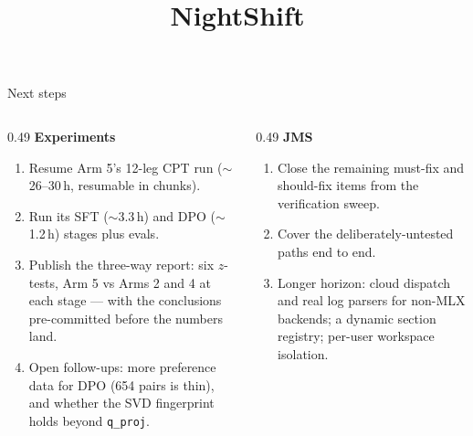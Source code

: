 \documentclass[aspectratio=169,11pt]{beamer}
\begin{document}
\begin{frame}{Next steps}
  \small
  \begin{columns}[T]
    \begin{column}{0.49\textwidth}
      \textbf{Experiments}
      \begin{enumerate}
        \item Resume Arm 5's 12-leg CPT run ($\sim$26--30\,h, resumable in chunks).
        \item Run its SFT ($\sim$3.3\,h) and DPO ($\sim$1.2\,h) stages plus evals.
        \item Publish the three-way report: six $z$-tests, Arm 5 vs Arms 2 and 4 at each stage --- with the conclusions pre-committed before the numbers land.
        \item Open follow-ups: more preference data for DPO (654 pairs is thin), and whether the SVD fingerprint holds beyond \texttt{q\_proj}.
      \end{enumerate}
    \end{column}
    \begin{column}{0.49\textwidth}
      \textbf{JMS}
      \begin{enumerate}
        \item Close the remaining must-fix and should-fix items from the verification sweep.
        \item Cover the deliberately-untested paths end to end.
        \item Longer horizon: cloud dispatch and real log parsers for non-MLX backends; a dynamic section registry; per-user workspace isolation.
      \end{enumerate}
    \end{column}
  \end{columns}
\end{frame}




\title[NightShift: an overnight agent harness]{NightShift}
\end{document}
